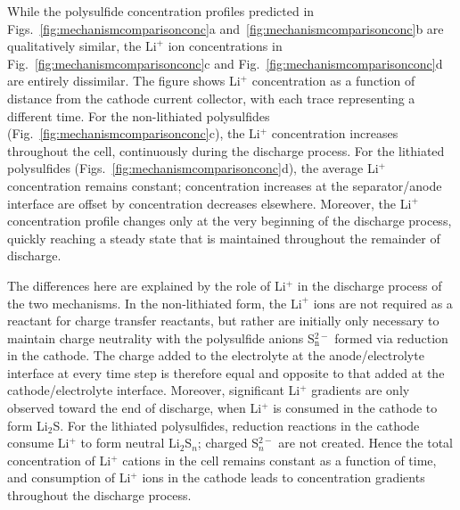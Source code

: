 \documentclass{elsarticle}
\begin{document}
While the polysulfide concentration profiles predicted in Figs.~\ref{fig:mechanismcomparisonconc}a and~\ref{fig:mechanismcomparisonconc}b are qualitatively similar, the $\mathrm{Li}^+$ ion concentrations in Fig.~\ref{fig:mechanismcomparisonconc}c and Fig.~\ref{fig:mechanismcomparisonconc}d are entirely dissimilar.  The figure shows Li$^+$ concentration as a function of distance from the cathode current collector, with each trace representing a different time.  For the non-lithiated polysulfides (Fig.~\ref{fig:mechanismcomparisonconc}c), the Li$^+$ concentration increases throughout the cell, continuously during the discharge process.  For the lithiated polysulfides (Figs.~\ref{fig:mechanismcomparisonconc}d), the average Li$^+$ concentration remains constant; concentration increases at the separator/anode interface are offset by concentration decreases elsewhere.  Moreover, the Li$^+$ concentration profile changes only at the very beginning of the discharge process, quickly reaching a steady state that is maintained throughout the remainder of discharge.

The differences here are explained by the role of Li$^+$ in the discharge process of the two mechanisms. In the non-lithiated form, the $\mathrm{Li}^+$ ions are not required as a reactant for charge transfer reactants, but rather are initially only necessary to maintain charge neutrality with the polysulfide anions S$_\mathrm{n}^{2-}$ formed via reduction in the cathode. The charge added to the electrolyte at the anode/electrolyte interface at every time step is therefore equal and opposite to that added at the cathode/electrolyte interface. Moreover, significant Li$^+$ gradients are only observed toward the end of discharge, when Li$^+$ is consumed in the cathode to form Li$_2$S.  For the lithiated polysulfides, reduction reactions in the cathode consume Li$^+$ to form neutral Li$_2$S$_n$; charged S$_n^{2-}$ are not created.  Hence the total concentration of Li$^+$ cations in the cell remains constant as a function of time, and consumption of Li$^+$ ions in the cathode leads to concentration gradients throughout the discharge process.
\end{document}
